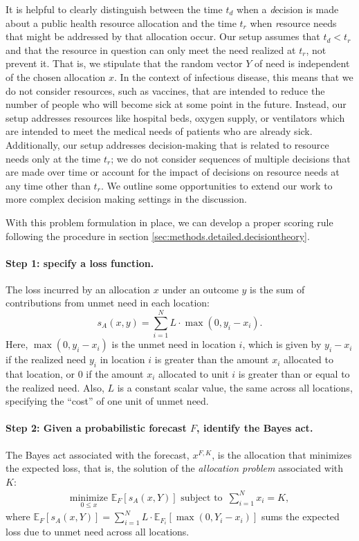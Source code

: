 \documentclass{article}\usepackage[]{graphicx}\usepackage[]{xcolor}
\begin{document}
It is helpful to clearly distinguish between the time $t_d$ when a \emph{d}ecision is made about a public health
resource allocation and the time $t_r$ when \emph{r}esource needs that might be addressed by that allocation occur. Our
setup assumes that $t_d < t_r$ and that the resource in question can only meet the need realized at $t_r$, not prevent
it. That is, we stipulate that the random vector $Y$ of need is independent of the chosen allocation $x$. In the
context of infectious disease, this means that we do not consider resources, such as vaccines, that are intended to
reduce the number of people who will become sick at some point in the future. Instead, our setup addresses resources
like hospital beds, oxygen supply, or ventilators which are intended to meet the medical needs of patients who are
already sick. Additionally, our setup addresses decision-making that is related to resource needs only at the time
$t_r$; we do not consider sequences of multiple decisions that are made over time or account for the impact of decisions
on resource needs at any time other than $t_r$. We outline some opportunities to extend our work to more complex
decision making settings in the discussion.

With this problem formulation in place, we can develop a proper scoring rule following the procedure in section
\ref{sec:methods.detailed.decisiontheory}.

\paragraph{Step 1: specify a loss function.} The loss incurred by an allocation $x$ under an outcome $y$ is the sum of
contributions from unmet need in each location:
\begin{equation}
  s_A(x, y) = \sum_{i=1}^N L \cdot \max(0, y_i - x_i). \label{eqn:loss_fn}
\end{equation}
Here, $\max(0, y_i - x_i)$ is the unmet need in location $i$, which is given by $y_i - x_i$ if the realized need $y_i$
in location $i$ is greater than the amount $x_i$ allocated to that location, or $0$ if the amount $x_i$ allocated to
unit $i$ is greater than or equal to the realized need. Also, $L$ is a constant scalar value, the same across all
locations, specifying the ``cost'' of one unit of unmet need.

\paragraph{Step 2: Given a probabilistic forecast $F$, identify the Bayes act.} The Bayes act associated with the
forecast, $x^{F,K}$, is the allocation that minimizes the expected loss, that is, the solution of the \emph{allocation
problem} associated with $K$:
\begin{align}
  \underset{0 \leq x}{\mathrm{minimize}}\,\, \mathbb{E}_{F} [s_A(x, Y)] \text{ subject to }
  \, \sum_{i=1}^N x_i = K, \label{AP}
\end{align}
where $\mathbb{E}_{F} [s_A(x, Y)] = \sum_{i=1}^{N} L \cdot \mathbb{E}_{F_i}[\max(0, Y_i - x_i)]$ sums the expected loss
due to unmet need across all locations.
\end{document}
